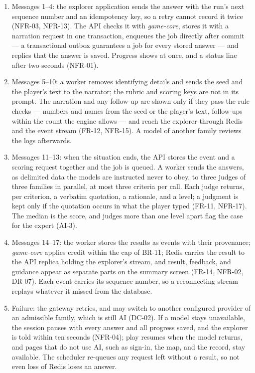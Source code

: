 \begin{enumerate}[leftmargin=1.5em]
  \item Messages 1--4: the explorer application sends the answer with the run's next sequence number and an idempotency key, so a retry cannot record it twice (NFR-03, NFR-13). The API checks it with \textit{game-core}, stores it with a narration request in one transaction, enqueues the job directly after commit --- a transactional outbox\cite{r167} guarantees a job for every stored answer --- and replies that the answer is saved. Progress shows at once, and a status line after two seconds (NFR-01).
  \item Messages 5--10: a worker removes identifying details and sends the seed and the player's text to the narrator; the rubric and scoring keys are not in its prompt. The narration and any follow-up are shown only if they pass the rule checks --- numbers and names from the seed or the player's text, follow-ups within the count the engine allows --- and reach the explorer through Redis and the event stream (FR-12, NFR-15). A model of another family reviews the logs afterwards.
  \item Messages 11--13: when the situation ends, the API stores the event and a scoring request together and the job is queued. A worker sends the answers, as delimited data the models are instructed never to obey, to three judges of three families in parallel, at most three criteria per call. Each judge returns, per criterion, a verbatim quotation, a rationale, and a level; a judgment is kept only if the quotation occurs in what the player typed (FR-11, NFR-17). The median is the score, and judges more than one level apart flag the case for the expert (AI-3).
  \item Messages 14--17: the worker stores the results as events with their provenance; \textit{game-core} applies credit within the cap of BR-11; Redis carries the result to the API replica holding the explorer's stream, and result, feedback, and guidance appear as separate parts on the summary screen (FR-14, NFR-02, DR-07). Each event carries its sequence number, so a reconnecting stream replays whatever it missed from the database.
  \item Failure: the gateway retries, and may switch to another configured provider of an admissible family, which is still AI (DC-02). If a model stays unavailable, the session pauses with every answer and all progress saved, and the explorer is told within ten seconds (NFR-04); play resumes when the model returns, and pages that do not use AI, such as sign-in, the map, and the record, stay available. The scheduler re-queues any request left without a result, so not even loss of Redis loses an answer.
\end{enumerate}


